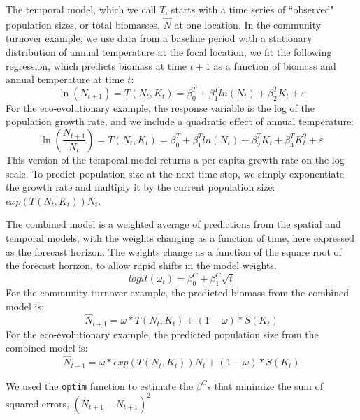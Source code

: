 \documentclass[11pt]{article}
\begin{document}
The temporal model, which we call $T$, starts with a time series of ``observed" population sizes, or total biomasses, $\vec{N}$ at one location. In the community turnover example, we use data from a baseline period with a stationary distribution of annual temperature at the focal location, we fit the following regression, which predicts biomass at time $t+1$ as a function of biomass and annual temperature at time $t$:
 \begin{equation}
 \ln(N_{t+1}) = T(N_t,K_t) = \beta^T_0 +  \beta^T_1 ln(N_t) +\beta^T_2 K_t  +  \varepsilon
 \label{eqn:temporal_regression_community}
 \end{equation}
 For the eco-evolutionary example, the response variable is the log of the population growth rate, and we include a quadratic effect of annual temperature:
  \begin{equation}
  \ln(\frac{N_{t+1}}{N_t}) = T(N_t,K_t) = \beta^T_0 +  \beta^T_1 ln(N_t) +\beta^T_2 K_t  +\beta^T_3 K_t^2 +  \varepsilon
  \label{eqn:temporal_regression_ecoevo}
  \end{equation}
 This version of the temporal model returns a per capita growth rate on the log scale. To predict population size at the next time step, we simply exponentiate the growth rate and multiply it by the current population size: $exp(T(N_t,K_t)) N_t$.

The combined model is a weighted average of predictions from the spatial and temporal models, with the weights changing as a function of time, here expressed as the forecast horizon. The weights change as a function of the square root of the forecast horizon, to allow rapid shifts in the model weights. 
\begin{equation}
logit(\omega_t)=\beta^C_0 + \beta^C_1 \sqrt{t}
\label{eqn:weights}
\end{equation}
For the community turnover example, the predicted biomass from the combined model is:
\begin{equation}
\hat{N}_{t+1} = \omega *T(N_{t},K_t) + (1-\omega) * S(K_t) 
\label{eqn:combined_model}
\end{equation}
For the eco-evolutionary example, the predicted population size from the combined model is:
\begin{equation}
\hat{N}_{t+1} = \omega * exp(T(N_{t},K_t)) N_t + (1-\omega) * S(K_t) 
\label{eqn:combined_model}
\end{equation}

We used the \texttt{optim} function to estimate the $\beta^C$s that minimize the sum of squared errors, $(\hat{N}_{t+1} - N_{t+1})^2$
\end{document}
